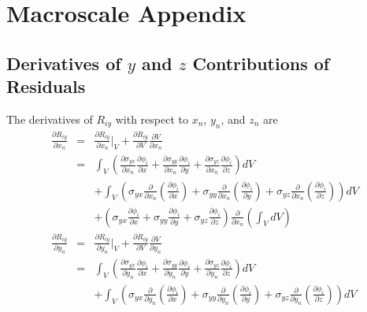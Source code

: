 \chapter{Macroscale Appendix}
\section{Derivatives of $y$ and $z$ Contributions of Residuals}
\label{app:dRy_and_dRz}

The derivatives of $R_{iy}$ with respect to $x_n$, $y_n$, and $z_n$ are
%
\begin{eqnarray}
\frac{\partial R_{iy}}{\partial x_n} &=& \frac{\partial R_{iy}}{\partial x_n} \bigg |_V + \frac{\partial R_{iy}}{\partial V} \frac{\partial V}{\partial x_n} \nonumber\\
&=& \int_V \left(\frac{\partial \sigma_{yx}}{\partial x_n}\frac{\partial \phi_i}{\partial x} + \frac{\partial \sigma_{yy}}{\partial x_n}\frac{\partial \phi_i}{\partial y} + \frac{\partial \sigma_{yz}}{\partial x_n}\frac{\partial \phi_i}{\partial z}  \right) dV \nonumber\\
&&+ \int_V \left( \sigma_{yx} \frac{\partial}{\partial x_n} \left(\frac{\partial \phi_i}{\partial x}\right)+\sigma_{yy} \frac{\partial}{\partial x_n} \left(\frac{\partial \phi_i}{\partial y}\right) + \sigma_{yz} \frac{\partial}{\partial x_n} \left(\frac{\partial \phi_i}{\partial z}\right) \right) dV \nonumber\\
&& + \left(  \sigma_{yx} \frac{\partial \phi_i}{\partial x} + \sigma_{yy} \frac{\partial \phi_i}{\partial y} + \sigma_{yz} \frac{\partial \phi_i}{\partial z} \right) \frac{\partial}{\partial x_n} \left(\int_V dV \right) \nonumber\\
\frac{\partial R_{iy}}{\partial y_n} &=& \frac{\partial R_{iy}}{\partial y_n} \bigg |_V + \frac{\partial R_{iy}}{\partial V} \frac{\partial V}{\partial y_n} \nonumber\\
&=& \int_V \left(\frac{\partial \sigma_{yx}}{\partial y_n}\frac{\partial \phi_i}{\partial x} +\frac{\partial \sigma_{yy}}{\partial y_n}\frac{\partial \phi_i}{\partial y} +  \frac{\partial \sigma_{yz}}{\partial y_n}\frac{\partial \phi_i}{\partial z}  \right) dV \nonumber\\
&& + \int_V \left( \sigma_{yx} \frac{\partial}{\partial y_n} \left(\frac{\partial \phi_i}{\partial x}\right)+ \sigma_{yy} \frac{\partial}{\partial y_n} \left(\frac{\partial \phi_i}{\partial y}\right) + \sigma_{yz} \frac{\partial}{\partial y_n} \left(\frac{\partial \phi_i}{\partial z}\right) \right) dV \nonumber\\

\end{eqnarray}

